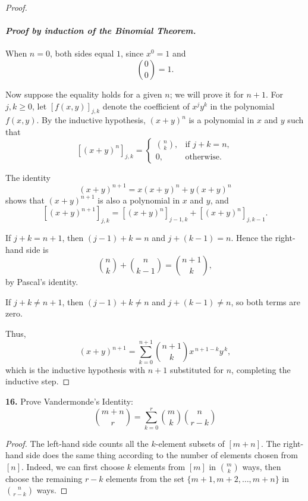 \documentclass[12pt]{amsart}
\begin{document}
\begin{onehalfspace}
\begin{proof}
            \paragraph{\emph{Proof by induction of the Binomial Theorem.}}

            When \(n=0\), both sides equal \(1\), since \(x^{0}=1\) and
            \[
                \binom{0}{0}=1.
            \]

            Now suppose the equality holds for a given \(n\); we will prove it for \(n+1\).
            For \(j,k \ge 0\), let \([f(x,y)]_{j,k}\) denote the coefficient of \(x^{j}y^{k}\)
            in the polynomial \(f(x,y)\).
            By the inductive hypothesis, \((x+y)^n\) is a polynomial in \(x\) and \(y\) such that
            \[
                [(x+y)^n]_{j,k} =
                \begin{cases}
                    \binom{n}{k}, & \text{if } j+k=n,\\
                    0, & \text{otherwise}.
                \end{cases}
            \]

            The identity
            \[
                (x+y)^{n+1} = x(x+y)^n + y(x+y)^n
            \]
            shows that \((x+y)^{n+1}\) is also a polynomial in \(x\) and \(y\), and
            \[
                [(x+y)^{n+1}]_{j,k}
                =
                [(x+y)^n]_{j-1,k}
                +
                [(x+y)^n]_{j,k-1}.
            \]

            If \(j+k=n+1\), then \((j-1)+k=n\) and \(j+(k-1)=n\). Hence the right-hand side is
            \[
                \binom{n}{k} + \binom{n}{k-1}
                =
                \binom{n+1}{k},
            \]
            by Pascal’s identity.

            If \(j+k \ne n+1\), then \((j-1)+k \ne n\) and \(j+(k-1) \ne n\), so both terms are zero.

            Thus,
            \[
                (x+y)^{n+1}
                =
                \sum_{k=0}^{n+1}
                \binom{n+1}{k}
                x^{\,n+1-k} y^{\,k},
            \]
            which is the inductive hypothesis with \(n+1\) substituted for \(n\), completing the
            inductive step.
        \end{proof}

        \textbf{16.} Prove Vandermonde's Identity:
        \begin{displaymath}
            \binom{m+n}{r} = \sum_{k=0}^r \binom{m}{k}\binom{n}{r-k}
        \end{displaymath}
        \begin{proof}
            The left-hand side counts all the $k$-element subsets of $[m + n]$.
            The right-hand side does the same thing according to the number of elements chosen from $[n]$.
            Indeed, we can first choose $k$ elements from $[m]$ in $\binom{m}{k}$ ways, then choose the remaining
            $r - k$ elements from the set $\{m+1, m+2, \ldots, m+n \}$ in $\binom{n}{r-k}$ ways.
        \end{proof}


\end{onehalfspace}
\end{document}
